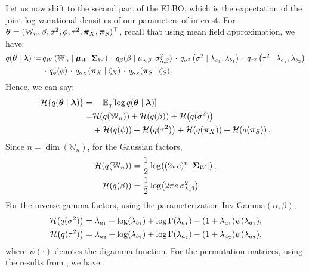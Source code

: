 \documentclass[numsec,webpdf,modern,medium,namedate]{oup-authoring-template}
\theoremstyle{thmstyleone}%
\theoremstyle{thmstyletwo}%
\theoremstyle{thmstylethree}%
\begin{document}
Let us now shift to the second part of the ELBO, which is the expectation of the joint log-variational densities of our parameters of interest. For $\boldsymbol{\theta} = (\mathbb{W}_n,\beta,\sigma^2,\phi,\tau^2,\boldsymbol{\pi}_X,\boldsymbol{\pi}_S)^\top$, recall that using mean field approximation, we have:
{\footnotesize
\begin{equation*}
\begin{split}
    q(\boldsymbol{\theta} \mid\boldsymbol{\lambda}) \coloneq &\, q_W\left(\mathbb{W}_n \mid \boldsymbol{\mu}_W, \boldsymbol{\Sigma}_W\right) \, \cdot\,  q_\beta(\beta\mid\mu_{\lambda,\beta},\sigma^2_{\lambda,\beta}) \, \cdot\,  q_{\sigma^2}\left(\sigma^2\mid\lambda_{a_1},\lambda_{b_1}\right)\,\cdot\, q_{\tau^2}\left(\tau^2\mid\lambda_{a_2},\lambda_{b_2}\right) \\
    &   \,\cdot\, q_\phi(\phi)\,\cdot\, q_{\kappa_X}(\boldsymbol{\pi}_X\mid\zeta_X)\,\cdot\, q_{\kappa_S}(\boldsymbol{\pi}_S\mid\zeta_S).
\end{split}
\end{equation*}}
Hence, we can say:
\begin{equation*}
    \begin{split}
        \calH\{q(\bth \mid \blam)\}
= & -\E_{q}\!\left[\log q(\bth \mid \blam)\right] \\
= & 
\calH\!\left(q(\mathbb{W}_n)\right)
+ \calH\!\left(q(\beta)\right)
+ \calH\!\left(q(\sigma^2)\right)\\
& + \calH\!\left(q(\phi)\right)
+ \calH\!\left(q(\tau^2)\right)
+ \calH\!\left(q(\bpix)\right)
+ \calH\!\left(q(\bpis)\right).
    \end{split}
\end{equation*}
Since $n=\dim(\mathbb{W}_n)$, for the Gaussian factors,
\begin{align*}
\mathcal{H}\!\left(q(\mathbb{W}_n)\right)
&=
\frac{1}{2}\log\!\left( (2\pi e)^n \, \lvert \boldsymbol{\Sigma}_W \rvert \right),\\
\mathcal{H}\!\left(q(\beta)\right)
&=
\frac{1}{2}\log\!\left( 2\pi e \, \sigma^2_{\lambda,\beta} \right)
\end{align*}
For the inverse-gamma factors, using the parameterization Inv-Gamma$(\alpha,\beta)$,
\begin{align*}
\mathcal{H}\!\left(q(\sigma^2)\right)
&=
\lambda_{a_1}
+ \log(\lambda_{b_1})
+ \log\Gamma(\lambda_{a_1})
- (1+\lambda_{a_1})\psi(\lambda_{a_1}), \\
\mathcal{H}\!\left(q(\tau^2)\right)
&=
\lambda_{a_2}
+ \log(\lambda_{b_2})
+ \log\Gamma(\lambda_{a_2})
- (1+\lambda_{a_2})\psi(\lambda_{a_2}),
\end{align*}
where $\psi(\cdot)$ denotes the digamma function. For the permutation matrices, using the results from \cite{linderman2018reparameterizing}, we have:
\end{document}
